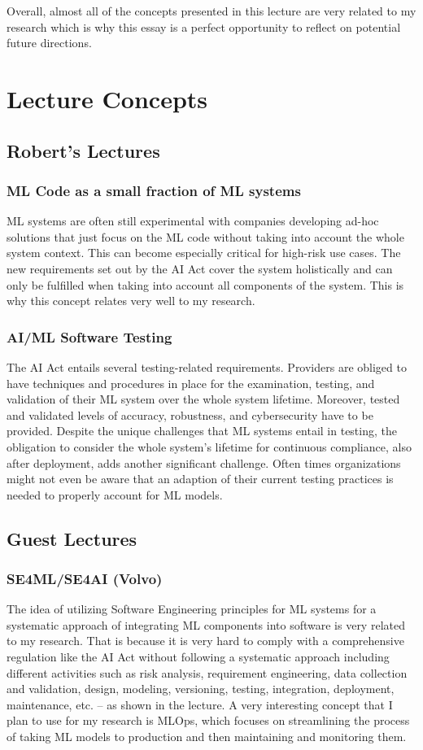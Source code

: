 \documentclass[titlepage,11pt]{article}
\begin{document}
Overall, almost all of the concepts presented in this lecture are very related to my research which is why this essay is a perfect opportunity to reflect on potential future directions.


\section{Lecture Concepts}
\subsection{Robert's Lectures}
\subsubsection{ML Code as a small fraction of ML systems~\cite{sculleyHiddenTechnicalDebt2015}}
ML systems are often still experimental with companies developing ad-hoc solutions that just focus on the ML code without taking into account the whole system context. This can become especially critical for high-risk use cases. The new requirements set out by the AI Act cover the system holistically and can only be fulfilled when taking into account all components of the system. This is why this concept relates very well to my research.

\subsubsection{AI/ML Software Testing}
The AI Act entails several testing-related requirements. Providers are obliged to have techniques and procedures in place for the examination, testing, and validation of their ML system over the whole system lifetime. Moreover, tested and validated levels of accuracy, robustness, and cybersecurity have to be provided. Despite the unique challenges that ML systems entail in testing, the obligation to consider the whole system's lifetime for continuous compliance, also after deployment, adds another significant challenge. Often times organizations might not even be aware that an adaption of their current testing practices is needed to properly account for ML models.

\subsection{Guest Lectures}
\subsubsection{SE4ML/SE4AI (Volvo)}
The idea of utilizing Software Engineering principles for ML systems for a systematic approach of integrating ML components into software is very related to my research. That is because it is very hard to comply with a comprehensive regulation like the AI Act without following a systematic approach including different activities such as risk analysis, requirement engineering, data collection and validation, design, modeling, versioning, testing, integration, deployment, maintenance, etc. – as shown in the lecture. A very interesting concept that I plan to use for my research is MLOps, which focuses on streamlining the process of taking ML models to production and then maintaining and monitoring them.
\end{document}
